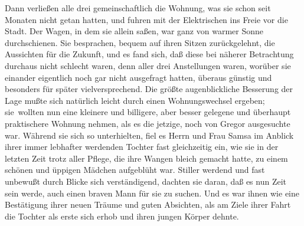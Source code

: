 Dann verließen alle drei gemeinschaftlich die Wohnung, was sie schon
seit Monaten nicht getan hatten, und fuhren mit der Elektrischen ins
Freie vor die Stadt. Der Wagen, in dem sie allein saßen, war ganz von
warmer Sonne durchschienen. Sie besprachen, bequem auf ihren Sitzen
zurückgelehnt, die Aussichten für die Zukunft, und es fand sich, daß
diese bei näherer Betrachtung durchaus nicht schlecht waren, denn aller
drei Anstellungen waren, worüber sie einander eigentlich noch gar nicht
ausgefragt hatten, überaus günstig und besonders für später
vielversprechend. Die größte augenblickliche Besserung der Lage mußte
sich natürlich leicht durch einen Wohnungswechsel ergeben; sie\est\ wollten
nun eine kleinere und billigere, aber besser gelegene und überhaupt
praktischere Wohnung nehmen, als es die jetzige, noch von Gregor
ausgesuchte war. Während sie sich so unterhielten, fiel es Herrn und
Frau Samsa im Anblick ihrer immer lebhafter werdenden Tochter fast
gleichzeitig ein, wie sie in der letzten Zeit trotz aller Pflege, die
ihre Wangen bleich gemacht hatte, zu einem schönen und üppigen Mädchen
aufgeblüht war. Stiller werdend und fast unbewußt durch Blicke sich
verständigend, dachten sie daran, daß es nun Zeit sein werde, auch einen
braven Mann für sie zu suchen. Und es war ihnen wie eine Bestätigung
ihrer neuen Träume und guten Absichten, als am Ziele ihrer Fahrt die
Tochter als erste sich erhob und ihren jungen Körper dehnte.